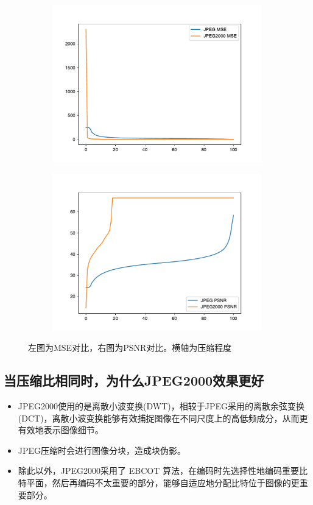 \documentclass{article}
\begin{document}
\begin{figure}[htbp]
    \centering
    \begin{subfigure}{.45\textwidth}
        \includegraphics[width=\linewidth]{img/mse.pdf}
    \end{subfigure}
    \begin{subfigure}{.45\textwidth}
        \includegraphics[width=\linewidth]{img/psnr.pdf}
    \end{subfigure}
    \caption{左图为MSE对比，右图为PSNR对比。横轴为压缩程度}
    \label{plot}
\end{figure}


\subsection{当压缩比相同时，为什么JPEG2000效果更好}

\begin{itemize}
    \item JPEG2000使用的是离散小波变换(DWT)，相较于JPEG采用的离散余弦变换(DCT)，离散小波变换能够有效捕捉图像在不同尺度上的高低频成分，从而更有效地表示图像细节。
    \item JPEG压缩时会进行图像分块，造成块伪影。
    \item 除此以外，JPEG2000采用了 EBCOT 算法，在编码时先选择性地编码重要比特平面，然后再编码不太重要的部分，能够自适应地分配比特位于图像的更重要部分。
\end{itemize}
\end{document}
